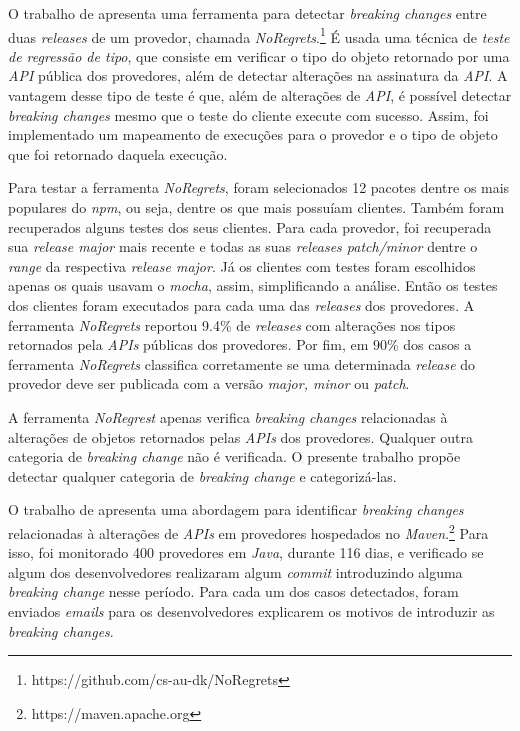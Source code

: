 O trabalho de  apresenta uma ferramenta para detectar \textit{breaking changes} entre duas \textit{releases} de um provedor, chamada \textit{NoRegrets}.\footnote{https://github.com/cs-au-dk/NoRegrets} É usada uma técnica de \textit{teste de regressão de tipo}, que consiste em verificar o tipo do objeto retornado por uma \textit{API} pública dos provedores, além de detectar alterações na assinatura da \textit{API}. A vantagem desse tipo de teste é que, além de alterações de \textit{API}, é possível detectar \textit{breaking changes} mesmo que o teste do cliente execute com sucesso. Assim, foi implementado um mapeamento de execuções para o provedor e o tipo de objeto que foi retornado daquela execução.

Para testar a ferramenta \textit{NoRegrets}, foram selecionados 12 pacotes dentre os mais populares do \textit{npm}, ou seja, dentre os que mais possuíam clientes. Também foram recuperados alguns testes dos seus clientes. Para cada provedor, foi recuperada sua \textit{release major} mais recente e todas as suas \textit{releases patch/minor} dentre o \textit{range} da respectiva \textit{release major}. Já os clientes com testes foram escolhidos apenas os quais usavam o \textit{mocha}, assim, simplificando a análise. Então os testes dos clientes foram executados para cada uma das \textit{releases} dos provedores. A ferramenta \textit{NoRegrets} reportou 9.4\% de \textit{releases} com alterações nos tipos retornados pela \textit{APIs} públicas dos provedores. Por fim, em 90\% dos casos a ferramenta \textit{NoRegrets} classifica corretamente se uma determinada \textit{release} do provedor deve ser publicada com a versão \textit{major, minor} ou \textit{patch}.

A ferramenta \textit{NoRegrest} apenas verifica \textit{breaking changes} relacionadas à alterações de objetos retornados pelas \textit{APIs} dos provedores. Qualquer outra categoria de \textit{breaking change} não é verificada. O presente trabalho propõe detectar qualquer categoria de \textit{breaking change} e categorizá-las.

O trabalho de  apresenta uma abordagem para identificar \textit{breaking changes} relacionadas à alterações de \textit{APIs} em provedores hospedados no \textit{Maven}.\footnote{https://maven.apache.org} Para isso, foi monitorado 400 provedores em \textit{Java}, durante 116 dias, e verificado se algum dos desenvolvedores realizaram algum \textit{commit} introduzindo alguma \textit{breaking change} nesse período.  Para cada um dos casos detectados, foram enviados \textit{emails} para os desenvolvedores explicarem os motivos de introduzir as \textit{breaking changes}.

